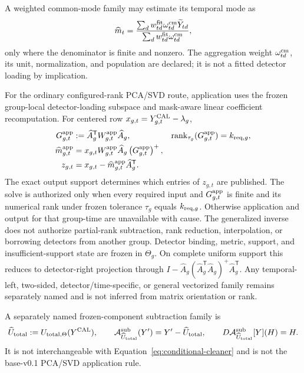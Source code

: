 A weighted common-mode family may estimate its temporal mode as
\begin{equation}
\widehat m_t=
\frac{\sum_d w^{\rm fit}_{td}\omega^{\rm cm}_{td}
      \widetilde Y_{td}}
     {\sum_d w^{\rm fit}_{td}\omega^{\rm cm}_{td}},
\label{eq:common-mode}
\end{equation}
only where the denominator is finite and nonzero. The aggregation weight
$\omega^{\rm cm}_{td}$, its unit, normalization, and population are declared;
it is not a fitted detector loading by implication.

For the ordinary configured-rank PCA/SVD route, application uses the frozen
group-local detector-loading subspace and mask-aware linear coefficient
recomputation. For centered row
$x_{g,t}=Y^{\rm CAL}_{g,t}-\lambda_g$,
\begin{equation}
\begin{aligned}
G^{\rm app}_{g,t}
&:=\widehat A_g^{\mathsf T}W^{\rm app}_{g,t}\widehat A_g,
&\operatorname{rank}_{\tau_g}(G^{\rm app}_{g,t})
&=k_{{\rm req},g},\\
\widehat m^{\rm app}_{g,t}
&=x_{g,t}W^{\rm app}_{g,t}\widehat A_g
  \left(G^{\rm app}_{g,t}\right)^+,\\
z_{g,t}
&=x_{g,t}-\widehat m^{\rm app}_{g,t}\widehat A_g^{\mathsf T}.
\end{aligned}
\label{eq:conditional-cleaner}
\end{equation}
The exact output support determines which entries of $z_{g,t}$ are published.
The solve is authorized only when every required input and
$G^{\rm app}_{g,t}$ is finite and its numerical rank under frozen tolerance
$\tau_g$ equals $k_{{\rm req},g}$. Otherwise application and output for that
group-time are unavailable with cause. The generalized inverse does not
authorize partial-rank subtraction, rank reduction, interpolation, or
borrowing detectors from another group. Detector binding, metric, support,
and insufficient-support state are frozen in $\Theta_g$. On complete uniform
support this reduces to detector-right projection through
$I-\widehat A_g(\widehat A_g^{\mathsf T}\widehat A_g)^+
\widehat A_g^{\mathsf T}$. Any temporal-left, two-sided,
detector/time-specific, or general vectorized family remains separately named
and is not inferred from matrix orientation or rank.

A separately named frozen-component subtraction family is
\begin{equation}
\widehat U_{\rm total}:=U_{{\rm total},\Theta}(Y^{\rm CAL}),
\qquad
\mathcal A^{\rm sub}_{\widehat U_{\rm total}}(Y')=Y'-\widehat U_{\rm total},
\qquad
D\mathcal A^{\rm sub}_{\widehat U_{\rm total}}[Y](H)=H.
\label{eq:frozen-component}
\end{equation}
It is not interchangeable with Equation~\ref{eq:conditional-cleaner} and is
not the base-v0.1 PCA/SVD application rule.

